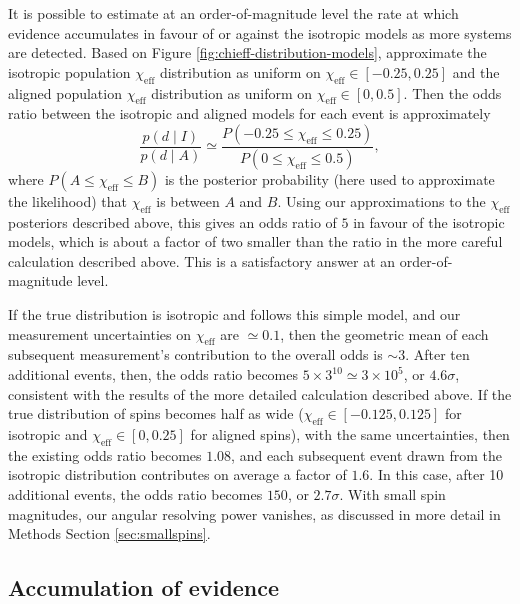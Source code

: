 \documentclass{nature-arxiv}
\newcommand{\chieff}{\chi_\mathrm{eff}}
\begin{document}
\begin{methods}
It is possible to estimate at an order-of-magnitude level the rate at
which evidence accumulates in favour of or against the isotropic
models as more systems are detected.  Based on Figure
\ref{fig:chieff-distribution-models}, approximate the isotropic
population $\chieff$ distribution as uniform on
$\chieff \in \left[ -0.25, 0.25 \right]$ and the aligned population
$\chieff$ distribution as uniform on
$\chieff \in \left[0, 0.5\right]$.  Then the odds ratio between the
isotropic and aligned models for each event is approximately
\begin{equation}
  \label{eq:approx-odds}
  \frac{p\left( d \mid I \right)}{p\left( d \mid A \right)} \simeq
  \frac{P\left( -0.25 \leq \chieff \leq 0.25 \right)}{P\left( 0 \leq \chieff \leq 0.5 \right) },
\end{equation}
where $P\left( A \leq \chieff \leq B \right)$ is the posterior
probability (here used to approximate the likelihood) that $\chieff$
is between $A$ and $B$.  Using our approximations to the $\chieff$
posteriors described above, this gives an odds ratio of $5$ in favour
of the isotropic models, which is about a factor of two smaller than
the ratio in the more careful calculation described above.  This is a
satisfactory answer at an order-of-magnitude level.

If the true distribution is isotropic and follows this simple model,
and our measurement uncertainties on $\chieff$ are $\simeq 0.1$, then
the geometric mean of each subsequent measurement's contribution to
the overall odds is $\sim 3$.  After ten additional events, then, the
odds ratio becomes $5 \times 3^{10} \simeq 3 \times 10^{5}$, or
$4.6 \sigma$, consistent with the results of the more detailed
calculation described above.  If the true distribution of spins
becomes half as wide ($\chieff \in [-0.125, 0.125]$ for isotropic and
$\chieff \in [0, 0.25]$ for aligned spins), with the same
uncertainties, then the existing odds ratio becomes $1.08$, and each
subsequent event drawn from the isotropic distribution contributes on
average a factor of $1.6$.  In this case, after 10 additional events,
the odds ratio becomes $150$, or $2.7\sigma$.  With small spin
magnitudes, our angular resolving power vanishes, as discussed in more
detail in Methods Section \ref{sec:smallspins}.

\subsection{Accumulation of evidence}


\end{methods}
\end{document}
